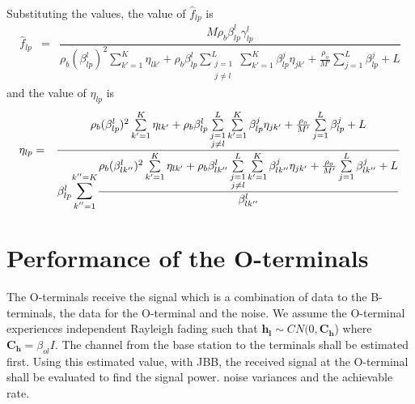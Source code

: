 \documentclass[10pt, a4paper, twoside,fleqn]{article}
\begin{document}
Substituting the values, the value of $\hat f_{lp}$ is
\begin{eqnarray}
	\hat f_{lp} &=& \dfrac{M\rho_b\beta_{lp}^{l}\gamma_{lp}^{l}}
                            {\rho_b(\beta_{lp}^{l})^2\sum\limits_{k' = 1}^{K}\eta_{lk'}
                            +\rho_b\beta_{lp}^{l} \sum\limits_{\substack{j=1 \\ j \neq l}}^{L} \sum\limits_{k' = 1}^{K}\beta^{j}_{lp}\eta_{jk'}
		  	    +\frac{\rho_o}{M'} \sum\limits_{j=1}^{L}\beta_{lp}^{j}
						   +L}
\end{eqnarray}
and the value of $\eta_{lp}$ is
\begin{eqnarray}
	\eta_{lp} &=&  \dfrac{\rho_b(\beta_{lp}^{l})^2\sum\limits_{k' = 1}^{K}\eta_{lk'}
                            +\rho_b\beta_{lp}^{l} \sum\limits_{\substack{j=1 \\ j \neq l}}^{L} \sum\limits_{k' = 1}^{K}\beta^{j}_{lp}\eta_{jk'}
		  	    +\frac{\rho_o}{M'} \sum\limits_{j=1}^{L}\beta_{lp}^{j}+L}
			     {\beta_{lp}^{l}\mathlarger{\mathlarger{\sum}}\limits_{k''=1}^{k''=K}\dfrac{
                            \rho_b(\beta_{lk''}^{l})^2\sum\limits_{k' = 1}^{K}\eta_{lk'}
                            +\rho_b\beta_{lk''}^{l} \sum\limits_{\substack{j=1 \\ j \neq l}}^{L} \sum\limits_{k' = 1}^{K}\beta^{j}_{lk''}\eta_{jk'}
		  	    +\frac{\rho_o}{M'} \sum\limits_{j=1}^{L}\beta_{lk''}^{j}
						   +L}{\beta_{lk''}^{l}}}
\end{eqnarray}

\section{Performance of the O-terminals}
	The O-terminals receive the signal which is a combination of data to the B-terminals, the data for the O-terminal and the noise. We assume the O-terminal experiences independent Rayleigh fading such that $\mathbf{h_{l}} \sim CN(0,\mathbf{C_h}$) where $\mathbf{C_h} = \beta_{ol}I$. The channel from the base station to the terminals shall be estimated first. Using this estimated value, with JBB, the received signal at the O-terminal shall be evaluated to find the signal power. noise variances and the achievable rate.
\end{document}
